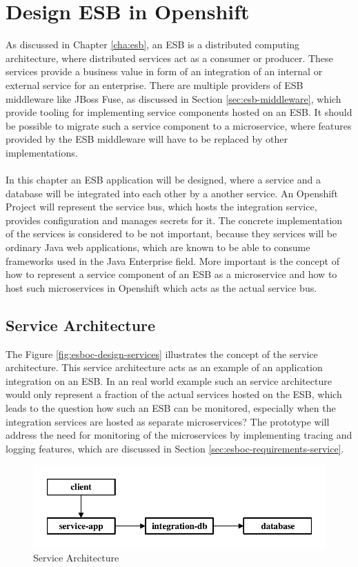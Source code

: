 \chapter{Design ESB in Openshift}
\label{cha:esboc}
As discussed in Chapter \vref{cha:esb}, an ESB is a distributed computing architecture, where distributed services act as a consumer or producer. These services provide a business value in form of an integration of an internal or external service for an enterprise. There are multiple providers of ESB middleware like JBoss Fuse, as discussed in Section \vref{sec:esb-middleware}, which provide tooling for implementing service components hosted on an ESB. It should be possible to migrate such a service component to a microservice, where features provided by the ESB middleware will have to be replaced by other implementations.
\\ \\
In this chapter an ESB application will be designed, where a service and a database will be integrated into each other by a another service. An Openshift Project will represent the service bus, which hosts the integration service, provides configuration and manages secrets for it. The concrete implementation of the services is considered to be not important, because they services will be ordinary Java web applications, which are known to be able to consume frameworks used in the Java Enterprise field. More important is the concept of how to represent a service component of an ESB as a microservice and how to host such microservices in Openshift which acts as the actual service bus.

\section{Service Architecture}
The Figure \vref{fig:esboc-design-services} illustrates the concept of the service architecture. This service architecture acts as an example of an application integration on an ESB. In an real world example such an service architecture would only represent a fraction of the actual services hosted on the ESB, which leads to the question how such an ESB can be monitored, especially when the integration services are hosted as separate microservices? The prototype will address the need for monitoring of the microservices by implementing tracing and logging features, which are discussed in Section \vref{sec:esboc-requirements-service}.

\begin{figure}[htbp]
	\centering
	\includegraphics[scale=1]{images/esboc-design-services.pdf}
	\caption{Service Architecture}
	\label{fig:esboc-design-services}
\end{figure} 


